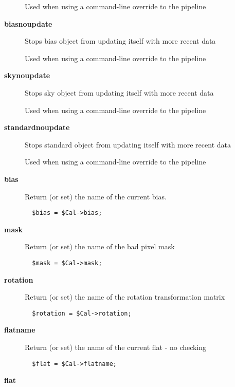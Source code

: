 \begin{description}
Used when using a command-line override to the pipeline

\item[\textbf{biasnoupdate}] \mbox{}

Stops bias object from updating itself with more recent data



Used when using a command-line override to the pipeline

\item[\textbf{skynoupdate}] \mbox{}

Stops sky object from updating itself with more recent data



Used when using a command-line override to the pipeline

\item[\textbf{standardnoupdate}] \mbox{}

Stops standard object from updating itself with more recent data



Used when using a command-line override to the pipeline

\item[\textbf{bias}] \mbox{}

Return (or set) the name of the current bias.

\begin{verbatim}
  $bias = $Cal->bias;
\end{verbatim}
\item[\textbf{mask}] \mbox{}

Return (or set) the name of the bad pixel mask

\begin{verbatim}
  $mask = $Cal->mask;
\end{verbatim}
\item[\textbf{rotation}] \mbox{}

Return (or set) the name of the rotation transformation matrix

\begin{verbatim}
  $rotation = $Cal->rotation;
\end{verbatim}
\item[\textbf{flatname}] \mbox{}

Return (or set) the name of the current flat - no checking

\begin{verbatim}
  $flat = $Cal->flatname;
\end{verbatim}
\item[\textbf{flat}] \mbox{}


\end{description}
